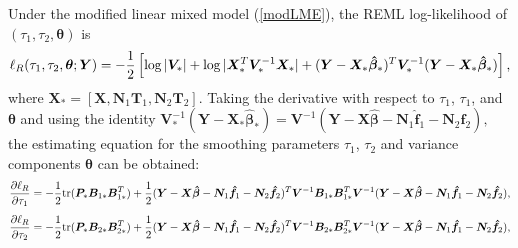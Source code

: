 \documentclass[article,lineno]{biometrika}
\begin{document}
Under the  modified linear mixed model (\ref{modLME}), the REML log-likelihood of $(\tau_1, \tau_2, \boldsymbol \theta)$ is 
$$
\ell_R(\tau_1, \tau_2, \boldsymbol \theta; \boldsymbol Y) 
 =
 -{1\over 2}  
\left[
 \log |\boldsymbol  V_*|  +  \log |\boldsymbol X_*^T \boldsymbol V_*^{-1} \boldsymbol X_*| 
 +  (\boldsymbol Y - \boldsymbol X_* \boldsymbol {\hat \beta}_*)^T 
 \boldsymbol V_* ^{-1}  
 (\boldsymbol Y - \boldsymbol X_* \boldsymbol   {\hat \beta}_*) 
\right],
$$
where 
$\boldsymbol X_* = [\boldsymbol X, \boldsymbol N_1 \boldsymbol T_1, \boldsymbol N_2 \boldsymbol T_2]$. 
Taking the derivative with respect to $\tau_1$, $\tau_1$, and $\boldsymbol \theta$ and using the identity 
$
\boldsymbol V^{-1}_*
(\boldsymbol Y - \boldsymbol X_* \boldsymbol   {\hat \beta}_*) 
=
\boldsymbol V^{-1} 
(\boldsymbol Y - \boldsymbol X \boldsymbol {\hat\beta} 
- \boldsymbol N_1 \boldsymbol {\hat f}_1
 - \boldsymbol N_2 \boldsymbol {\hat f}_2),
$
the estimating equation  for the smoothing parameters $\tau_1$, $\tau_2$ 
and variance components $\boldsymbol \theta$  can be obtained:
\begin{equation} \label{score_tau1}
{\partial \ell_R  \over \partial \tau_1}
=
- {1 \over 2}
{\rm tr} (\boldsymbol P_* \boldsymbol B_{1*} \boldsymbol B_{1*}^T) 
+ {1 \over 2} 
(\boldsymbol Y - \boldsymbol X \boldsymbol {\hat\beta} - \boldsymbol N_1 \boldsymbol {\hat f}_1
 - \boldsymbol N_2 \boldsymbol {\hat f}_2)^T
\boldsymbol V^{-1}  
\boldsymbol B_{1*} \boldsymbol B_{1*}^T
\boldsymbol V^{-1}  
(\boldsymbol Y - \boldsymbol X \boldsymbol {\hat\beta} - \boldsymbol N_1 \boldsymbol {\hat f}_1
 - \boldsymbol N_2 \boldsymbol {\hat f}_2),
\end{equation}
\begin{equation} \label{score_tau2}
{\partial \ell_R  \over \partial \tau_2}
=
- {1 \over 2}
{\rm tr} (\boldsymbol P_* \boldsymbol B_{2*} \boldsymbol B_{2*}^T)
+ {1 \over 2} 
(\boldsymbol Y - \boldsymbol X \boldsymbol {\hat\beta} - \boldsymbol N_1 \boldsymbol {\hat f}_1
 - \boldsymbol N_2 \boldsymbol {\hat f}_2)^T
\boldsymbol V^{-1}  
\boldsymbol B_{2*} \boldsymbol B_{2*}^T
\boldsymbol V^{-1}  
(\boldsymbol Y - \boldsymbol X \boldsymbol {\hat\beta} - \boldsymbol N_1 \boldsymbol {\hat f}_1
 - \boldsymbol N_2 \boldsymbol {\hat f}_2),
\end{equation}
\end{document}
